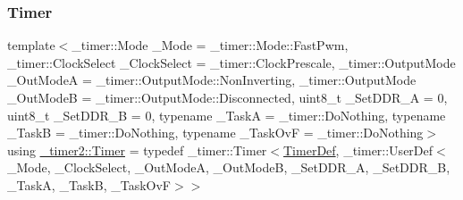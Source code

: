 \subsubsection{\texorpdfstring{Timer}{Timer}}
{\footnotesize\ttfamily template$<$\+\_\+timer\+::\+Mode \+\_\+\+Mode = \+\_\+timer\+::\+Mode\+::\+Fast\+Pwm, \+\_\+timer\+::\+Clock\+Select \+\_\+\+Clock\+Select = \+\_\+timer\+::\+Clock\+Prescale, \+\_\+timer\+::\+Output\+Mode \+\_\+\+Out\+ModeA = \+\_\+timer\+::\+Output\+Mode\+::\+Non\+Inverting, \+\_\+timer\+::\+Output\+Mode \+\_\+\+Out\+ModeB = \+\_\+timer\+::\+Output\+Mode\+::\+Disconnected, uint8\+\_\+t \+\_\+\+Set\+D\+D\+R\+\_\+A = 0, uint8\+\_\+t \+\_\+\+Set\+D\+D\+R\+\_\+B = 0, typename \+\_\+\+TaskA  = \+\_\+timer\+::\+Do\+Nothing, typename \+\_\+\+TaskB  = \+\_\+timer\+::\+Do\+Nothing, typename \+\_\+\+Task\+OvF  = \+\_\+timer\+::\+Do\+Nothing$>$ \\
using \hyperlink{namespace__timer2_a23e4155df8663ce860e8d55a709b9911}{\+\_\+timer2\+::\+Timer} = typedef \+\_\+timer\+::\+Timer$<$\hyperlink{struct__timer2_1_1TimerDef}{Timer\+Def}, \+\_\+timer\+::\+User\+Def$<$\+\_\+\+Mode, \+\_\+\+Clock\+Select, \+\_\+\+Out\+ModeA, \+\_\+\+Out\+ModeB, \+\_\+\+Set\+D\+D\+R\+\_\+A, \+\_\+\+Set\+D\+D\+R\+\_\+B, \+\_\+\+TaskA, \+\_\+\+TaskB, \+\_\+\+Task\+OvF$>$$>$}


